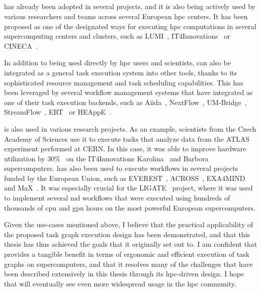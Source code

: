 \subsection*{\hyperqueue{}}
\hyperqueue{} has already been adopted in several projects, and it is also being
actively used by various researchers and teams across several European \gls{hpc}
centers. It has been proposed as one of the designated ways for executing
\gls{hpc} computations in several supercomputing centers and clusters, such as
LUMI~\cite{it4i-lumi}, IT4Innovations~\cite{it4i-hq} or
CINECA~\cite{cineca}.

In addition to being used directly by \gls{hpc} users and scientists,
\hyperqueue{} can also be integrated as a general task execution system into other
tools, thanks to its sophisticated resource management and task scheduling capabilities. This has
been leveraged by several workflow management systems that have integrated
\hyperqueue{} as one of their task execution backends, such as
Aiida~\cite{aiida-hq}, NextFlow~\cite{nextflow-hq},
UM-Bridge~\cite{umbridge}, StreamFlow~\cite{streamflow-hq},
ERT~\cite{ert} or HEAppE~\cite{heappe}.

\hyperqueue{} is also used in various research projects. As an example,
scientists from the Czech Academy of Sciences use it to execute tasks that analyze data from the
ATLAS~\cite{atlas} experiment performed at CERN. In this case, it was able to improve
hardware utilization by 30\%~\cite{cern-hq} on the IT4Innovations
Karolina~\cite{karolina} and Barbora~\cite{barbora} supercomputers.
\hyperqueue{} has also been used to execute workflows in several projects funded by
the European Union, such as EVEREST~\cite{everest}, ACROSS~\cite{across},
EXA4MIND~\cite{exa4mind} and MaX~\cite{max}. It was especially crucial
for the LIGATE~\cite{ligate} project, where it was used to implement several
\gls{md} workflows that were executed using hundreds of thousands of
\gls{cpu} and \gls{gpu} hours on the most powerful European
supercomputers.

Given the use-cases mentioned above, I believe that the practical applicability of the proposed
task graph execution design has been demonstrated, and that this thesis has thus achieved the goals
that it originally set out to. I am confident that \hyperqueue{} provides a tangible
benefit in terms of ergonomic and efficient execution of task graphs on supercomputers, and that it
resolves many of the challenges that have been described extensively in this thesis through its
\gls{hpc}-driven design. I hope that \hyperqueue{} will eventually
see even more widespread usage in the \gls{hpc} community.
